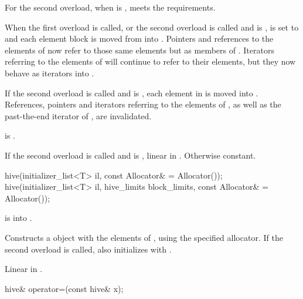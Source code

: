 \begin{itemdescr}
\pnum
\expects
For the second overload,
when  is ,
 meets the  requirements.

\pnum
\effects
When the first overload is called, or
the second overload is called and
 is ,
 is set to  and
each element block is moved from  into .
Pointers and references to the elements of  now refer to
those same elements but as members of .
Iterators referring to the elements of 
will continue to refer to their elements,
but they now behave as iterators into .

If the second overload is called and
 is ,
each element in  is moved into .
References, pointers and iterators referring to the elements of , as well as the past-the-end iterator of , are invalidated.

\pnum
\ensures
{} is .

\pnum
\complexity
If the second overload is called and
 is , linear in .
Otherwise constant.
\end{itemdescr}

%
\begin{itemdecl}
hive(initializer_list<T> il, const Allocator& = Allocator());
hive(initializer_list<T> il, hive_limits block_limits, const Allocator& = Allocator());
\end{itemdecl}

\begin{itemdescr}
\pnum
\expects
{} is  into .

\pnum
\effects
Constructs a  object with the elements of ,
using the specified allocator.
If the second overload is called,
also initializes  with .

\pnum
\complexity
Linear in .
\end{itemdescr}

%
\begin{itemdecl}
hive& operator=(const hive& x);
\end{itemdecl}

